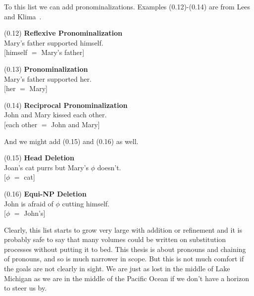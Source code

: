 \documentclass{article}
\begin{document}
To this list we can add pronominalizations. Examples
(0.12)-(0.14) are from Lees and Klima~\cite{LeesKlima63}.

\begin{enumerate*}
\item[(0.12)] \textbf{Reflexive Pronominalization}\\
Mary's father supported himself.\\
{}[himself ${=}$ Mary's father]
\end{enumerate*}

\begin{enumerate*}
\item[(0.13)] \textbf{Pronominalization}\\
Mary's father supported her.\\
{}[her ${=}$ Mary]
\end{enumerate*}

\begin{enumerate*}
\item[(0.14)] \textbf{Reciprocal Pronominalization}\\
John and Mary kissed each other.\\
{}[each other ${=}$ John and Mary]
\end{enumerate*}

And we might add (0.15) and (0.16) as well.

\begin{enumerate*}
\item[(0.15)] \textbf{Head Deletion}\\
Joan's cat purrs but Mary's ${\phi}$ doesn't.\\
{}[${\phi}$ ${=}$ cat]
\end{enumerate*}

\begin{enumerate*}
\item[(0.16)] \textbf{Equi-NP Deletion}\\
John is afraid of ${\phi}$ cutting himself.\\
{}[${\phi}$ ${=}$ John's]
\end{enumerate*}

Clearly, this list starts to grow very large with addition or
refinement and it is probably safe to say that many volumes
could be written on substitution processes without putting it to
bed. This thesis is about pronouns and chaining of pronouns, and
so is much narrower in scope. But this is not much comfort if
the goals are not clearly in sight. We are just as lost in the
middle of Lake Michigan as we are in the middle of the Pacific
Ocean if we don't have a horizon to steer us by.
\end{document}
